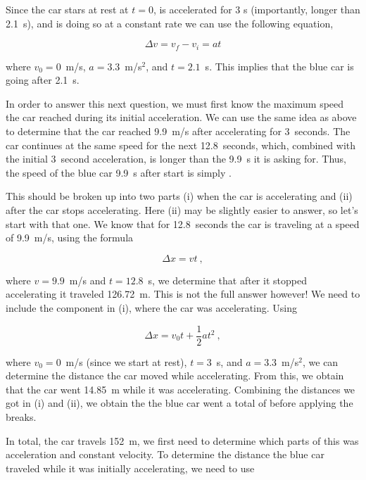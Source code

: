 \documentclass[]{flipit}
\begin{document}
\begin{enumi}
    \item Since the car stars at rest at $t=0$, is accelerated for 3 s (importantly, longer than 2.1~s), and is doing so at a constant rate we can use the following equation,

    \[\Delta v = v_f - v_i = at\]

    where $v_0 = 0$~m/s, $a=3.3$~m/s$^2$, and $t=2.1$~s. 
    This implies that the blue car is going  after 2.1~s.

    \item In order to answer this next question, we must first know the maximum speed the car reached during its initial acceleration.
    We can use the same idea as above to determine that the car reached 9.9~m/s after accelerating for 3~seconds.
    The car continues at the same speed for the next 12.8~seconds, which, combined with the initial 3~second acceleration, is longer than the 9.9~s it is asking for.
    Thus, the speed of the blue car 9.9~s after start is simply .

    \item This should be broken up into two parts (i) when the car is accelerating and (ii) after the car stops accelerating. 
    Here (ii) may be slightly easier to answer, so let's start with that one. 
    We know that for 12.8~seconds the car is traveling at a speed of 9.9~m/s, using the formula

    \[\Delta x = vt~,\]

    where $v=9.9$~m/s and $t=12.8$~s, we determine that after it stopped accelerating it traveled 126.72~m. 
    This is not the full answer however!
    We need to include the component in (i), where the car was accelerating.
    Using

    \[\Delta x = v_0 t + \frac12 a t^2~,\]

    where $v_0 = 0$~m/s (since we start at rest), $t=3$~s, and $a=3.3$~m/s$^2$, we can determine the distance the car moved while accelerating.
    From this, we obtain that the car went 14.85~m while it was accelerating.
    Combining the distances we got in (i) and (ii), we obtain the the blue car went a total of  before applying the breaks.

    \item In total, the car travels 152~m, we first need to determine which parts of this was acceleration and constant velocity. 
    To determine the distance the blue car traveled while it was initially accelerating, we need to use


\end{enumi}
\end{document}
